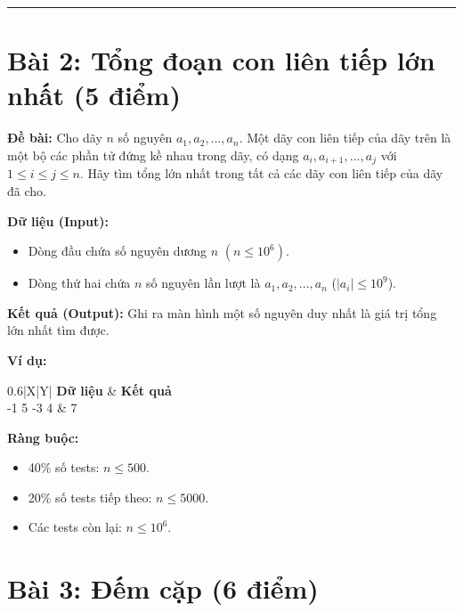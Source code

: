 \documentclass[11pt, a4paper]{article}
\begin{document}
\vspace{0.5cm}
\hrule
\vspace{0.5cm}

\section*{Bài 2: Tổng đoạn con liên tiếp lớn nhất (5 điểm)}

\textbf{Đề bài:}
Cho dãy $n$ số nguyên $a_{1},a_{2},...,a_{n}$. Một dãy con liên tiếp của dãy trên là một bộ các phần tử đứng kề nhau trong dãy, có dạng $a_{i},a_{i+1},...,a_{j}$ với $1 \le i \le j \le n$. Hãy tìm tổng lớn nhất trong tất cả các dãy con liên tiếp của dãy đã cho.

\textbf{Dữ liệu (Input):}
\begin{itemize}
    \item Dòng đầu chứa số nguyên dương $n$ $(n \le 10^{6})$.
    \item Dòng thứ hai chứa $n$ số nguyên lần lượt là $a_{1},a_{2},...,a_{n}$ ($|a_i| \le 10^9$).
\end{itemize}

\textbf{Kết quả (Output):} Ghi ra màn hình một số nguyên duy nhất là giá trị tổng lớn nhất tìm được.

\textbf{Ví dụ:}
\begin{center}
    \begin{tabularx}{0.6\textwidth}{|X|Y|}
        \hline
        \textbf{Dữ liệu} & \textbf{Kết quả} \\
          -1 5 -3 4 & 7 \\
        \hline
    \end{tabularx}
\end{center}

\textbf{Ràng buộc:}
\begin{itemize}
    \item 40\% số tests: $n \le 500$.
    \item 20\% số tests tiếp theo: $n \le 5000$.
    \item Các tests còn lại: $n \le 10^{6}$.
\end{itemize}

\newpage

\section*{Bài 3: Đếm cặp (6 điểm)}
\end{document}
